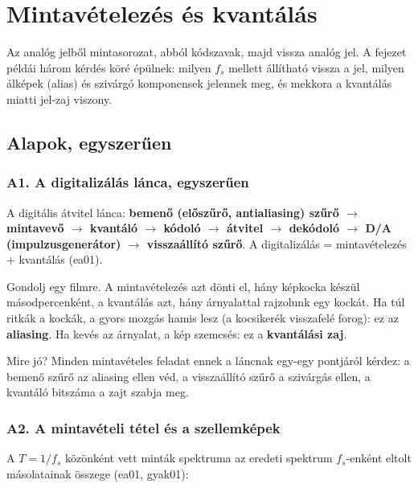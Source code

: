 \setcounter{chapter}{1}
\chapter{\texorpdfstring{Mintavételezés és kvantálás}{Mintavételezés és kvantálás}}\label{f2}
Az analóg jelből mintasorozat, abból kódszavak, majd vissza analóg jel. A fejezet példái három kérdés köré épülnek: milyen $f_s$ mellett állítható vissza a jel, milyen álképek (alias) és szivárgó komponensek jelennek meg, és mekkora a kvantálás miatti jel-zaj viszony.

\section{Alapok, egyszerűen}
\subsection{\texorpdfstring{A1. A digitalizálás lánca, egyszerűen}{A1. A digitalizálás lánca, egyszerűen}}\label{a2-lanc}
A digitális átvitel lánca: \textbf{bemenő (előszűrő, antialiasing) szűrő $\to$ mintavevő $\to$ kvantáló $\to$ kódoló $\to$ átvitel $\to$ dekódoló $\to$ D/A (impulzusgenerátor) $\to$ visszaállító szűrő}. A digitalizálás = mintavételezés + kvantálás (ea01).

Gondolj egy filmre. A mintavételezés azt dönti el, hány képkocka készül másodpercenként, a kvantálás azt, hány árnyalattal rajzolunk egy kockát. Ha túl ritkák a kockák, a gyors mozgás hamis lesz (a kocsikerék visszafelé forog): ez az \textbf{aliasing}. Ha kevés az árnyalat, a kép szemcsés: ez a \textbf{kvantálási zaj}.

Mire jó? Minden mintavételes feladat ennek a láncnak egy-egy pontjáról kérdez: a bemenő szűrő az aliasing ellen véd, a visszaállító szűrő a szivárgás ellen, a kvantáló bitszáma a zajt szabja meg.

\subsection{\texorpdfstring{A2. A mintavételi tétel és a szellemképek}{A2. A mintavételi tétel és a szellemképek}}\label{a2-mintaveteli-tetel}
A $T=1/f_s$ közönként vett minták spektruma az eredeti spektrum $f_s$-enként eltolt másolatainak összege (ea01, gyak01):

\begin{center}\end{center}

